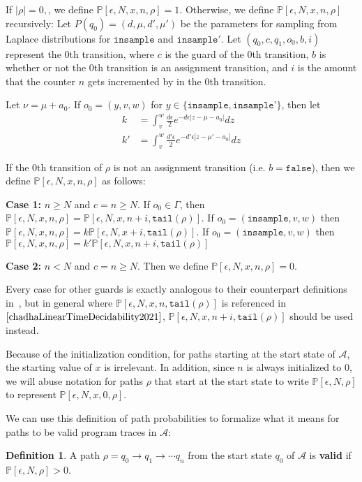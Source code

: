 \documentclass[12pt]{article}
\newcommand{\PP}{\mathbb{P}}
\theoremstyle{definition}
\newtheorem{defn}[thm]{Definition}
\begin{document}
If $|\rho| = 0, $, we define $\PP[\epsilon, N, x, n, \rho] = 1$.
Otherwise, we define $\PP[\epsilon, N, x, n, \rho]$ recursively:
Let $P(q_0) = (d, \mu, d', \mu')$ be the parameters for sampling from Laplace distributions for $\texttt{insample}$ and $\texttt{insample}'$. Let $(q_0, c, q_1, o_0, b, i)$ represent the 0th transition, where $c$ is the guard of the 0th transition, $b$ is whether or not the 0th transition is an assignment transition, and $i$ is the amount that the counter $n$ gets incremented by in the 0th transition.

Let $\nu = \mu + a_0$. If $o_0 = (y, v, w)$ for $y\in \{\texttt{insample}, \texttt{insample'}\}$, then let \begin{align*}
	k &= \int_{v}^{w}\frac{d\epsilon}{2}e^{-d\epsilon|z-\mu-a_0|}dz\\
	k' &= \int_v^w\frac{d'\epsilon}{2}e^{-d'\epsilon|z-\mu'-a_0|}dz
\end{align*}


If the 0th transition of $\rho$ is not an assignment transition (i.e. $b = \texttt{false}$), then we define $\PP[\epsilon, N, x, n, \rho]$ as follows:

\textbf{Case 1:} $n\geq N$ and $c = n \geq N$.
If $o_0 \in \Gamma$, then $\PP[\epsilon, N, x, n, \rho] = \PP[\epsilon, N, x, n+i, \texttt{tail}(\rho)]$. If $o_0 = (\texttt{insample}, v, w)$ then $\PP[\epsilon, N, x, n, \rho] = k\PP[\epsilon, N, x+i, \texttt{tail}(\rho)]$. If $o_0 = (\texttt{insample}, v, w)$ then $\PP[\epsilon, N, x, n, \rho] = k'\PP[\epsilon, N, x, n+i, \texttt{tail}(\rho)]$

\textbf{Case 2:} $n < N$ and $c = n\geq N$. Then we define $\PP[\epsilon, N, x, n, \rho] = 0$.

Every case for other guards is exactly analogous to their counterpart definitions in~\cite{chadhaLinearTimeDecidability2021}, but in general where $\PP[\epsilon,N, x, n, \texttt{tail}(\rho)]$ is referenced in $\cite{chadhaLinearTimeDecidability2021}$, $\PP[\epsilon, N,x, n+i ,\texttt{tail}(\rho)]$ should be used instead.

Because of the initialization condition, for paths starting at the start state of $\mathcal{A}$, the starting value of $x$ is irrelevant. In addition, since $n$ is always initialized to 0, we will abuse notation for paths $\rho$ that start at the start state to write $\PP[\epsilon, N, \rho]$ to represent $\PP[\epsilon, N, x, 0, \rho]$.

We can use this definition of path probabilities to formalize what it means for paths to be valid program traces in $\mathcal{A}$:
\begin{defn}
	A path $\rho = q_0\to q_1\to\cdots q_n$ from the start state $q_0$ of $\mathcal{A}$ is \textbf{valid} if $\PP[\epsilon, N, \rho]> 0$.
\end{defn}
\end{document}
